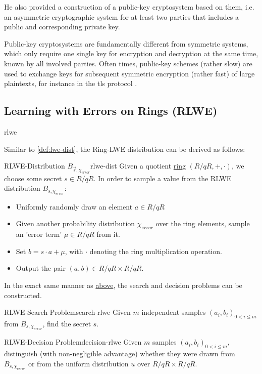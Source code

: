 He also provided a construction of a public-key cryptosystem based on them, i.e. an asymmetric cryptographic system for at least two parties that includes a public and corresponding private key.

Public-key cryptosystems are fundamentally different from symmetric systems, which only require one single key for encryption and decryption at the same time, known by all involved parties.
Often times, public-key schemes (rather slow) are used to exchange keys for subsequent symmetric encryption (rather fast) of large plaintexts, for instance in the \gls{tls} protocol \parencite{rfc8446}.

\subsection{Learning with Errors on Rings (RLWE)}
\Gls{rlwe}
\cite{2010-rlwe-original}

Similar to \autoref{def:lwe-dist}, the Ring-LWE distribution can be derived as follows:

\begin{corollary}{RLWE-Distribution $B_{\vec{s}, \chi_{error}}$}{rlwe-dist}
  Given a quotient \hyperref[def:ring]{ring} $(R/qR, +, \cdot)$, we choose some secret $s \in R/qR$.
  In order to sample a value from the RLWE distribution $B_{s, \chi_{error}}$:
  \begin{itemize}
    \item Uniformly randomly draw an element $a \in R/qR$
    \item Given another probability distribution $\chi_{error}$ over the ring elements,
          sample an 'error term' $\mu \in R/qR$ from it.
    \item Set $b = s \cdot a + \mu$, with $\cdot$ denoting the ring multiplication operation.
    \item Output the pair $(a, b) \in R/qR \times R/qR$.
  \end{itemize}
\end{corollary}

In the exact same manner as \hyperref[subsec:lwe]{above}, the search and decision problems can be constructed.

\begin{corollary}{RLWE-Search Problem}{search-rlwe}
  Given $m$ independent samples $(a_i, b_i)_{0 < i \leq m}$ from $B_{s, \chi_{error}}$, find the secret $s$.
\end{corollary}
\begin{corollary}{RLWE-Decision Problem}{decision-rlwe}
  Given $m$ samples $(a_i, b_i)_{0 < i \leq m}$, distinguish (with non-negligible advantage)
  whether they were drawn from $B_{s, \chi_{error}}$ or from the uniform distribution
  $u$ over $R/qR \times R/qR$.
\end{corollary}

